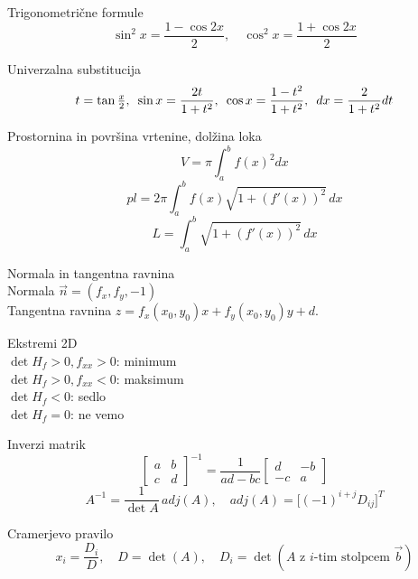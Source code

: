 \documentclass[a4paper,10pt]{article}
\begin{document}
\begin{multicols}{2}
\begin{formulaBox}{Trigonometrične formule}
\[
\sin^2 x = \frac{1-\cos 2x}{2},\quad \cos^2 x = \frac{1+\cos 2x}{2}
\]
\end{formulaBox}

\begin{formulaBox}{Univerzalna substitucija}
\[t=\tan \tfrac{x}{2},\hspace{0.5em}
\sin x = \frac{2t}{1+t^2},\hspace{0.5em}
\cos x = \frac{1-t^2}{1+t^2},\hspace{0.5em}
dx=\frac{2}{1+t^2}dt
\]
\end{formulaBox}

\begin{formulaBox}{Prostornina in površina vrtenine, dolžina loka}
\[
V = \pi\int_a^b f(x)^2 dx\]
\[
pl = 2\pi\int_a^b f(x)\sqrt{1+(f'(x))^2}\,dx
\]
\[L=\int_a^b \sqrt{1+(f'(x))^2}\,dx\]
\end{formulaBox}

\begin{formulaBox}{Normala in tangentna ravnina}
	\\
Normala $\vec{n}=(f_x,f_y,-1)$\\
Tangentna ravnina $z=f_x(x_0,y_0)x+f_y(x_0,y_0)y+d$.
\end{formulaBox}

\begin{formulaBox}{Ekstremi 2D}
	\\
$\det H_f>0, f_{xx}>0$: minimum\\
$\det H_f>0, f_{xx}<0$: maksimum\\
$\det H_f<0$: sedlo\\
$\det H_f=0$: ne vemo
\end{formulaBox}

\begin{formulaBox}{Inverzi matrik}
\[\begin{bmatrix}a&b\\c&d\end{bmatrix}^{-1}=\frac{1}{ad-bc}\begin{bmatrix}d&-b\\-c&a\end{bmatrix}
\]
\[
A^{-1} = \frac{1}{\det A}\,adj(A),\quad 
adj(A)=\big[(-1)^{i+j}D_{ij}\big]^T
\]
\end{formulaBox}

\begin{formulaBox}{Cramerjevo pravilo}
\[
x_i = \frac{D_i}{D},\quad D=\det(A),\quad D_i=\det(A \text{ z $i$-tim stolpcem $\vec b$})
\]
\end{formulaBox}


\end{multicols}
\end{document}

